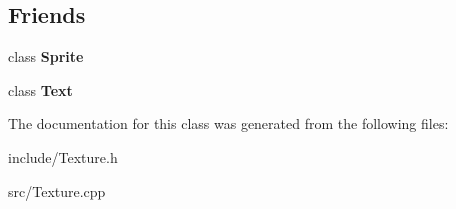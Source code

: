 \subsection*{Friends}
\begin{DoxyCompactItemize}
\item 
\hypertarget{classsdl_1_1Texture_a3292175d54d93d126ba2829249316344}{class {\bfseries Sprite}}\label{classsdl_1_1Texture_a3292175d54d93d126ba2829249316344}

\item 
\hypertarget{classsdl_1_1Texture_aee0ad1dafe471596e6d25530d9fbaf0c}{class {\bfseries Text}}\label{classsdl_1_1Texture_aee0ad1dafe471596e6d25530d9fbaf0c}

\end{DoxyCompactItemize}


The documentation for this class was generated from the following files\-:\begin{DoxyCompactItemize}
\item 
include/Texture.\-h\item 
src/Texture.\-cpp\end{DoxyCompactItemize}
